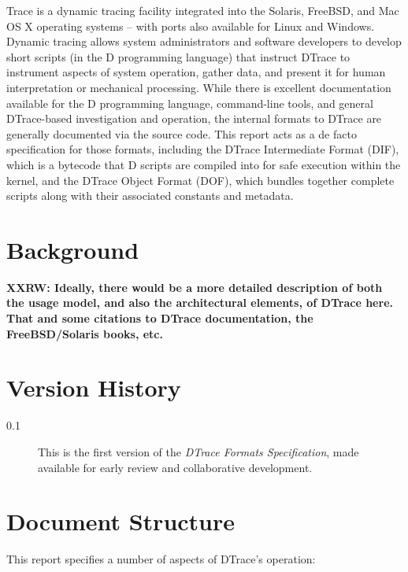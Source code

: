 Trace is a dynamic tracing facility integrated into the Solaris, FreeBSD,
and Mac OS X operating systems -- with ports also available for Linux and
Windows.
Dynamic tracing allows system administrators and software developers to
develop short scripts (in the D programming language) that instruct DTrace to
instrument aspects of system operation, gather data, and present it for human
interpretation or mechanical processing.
While there is excellent documentation available for the D programming
language, command-line tools, and general DTrace-based investigation and
operation, the internal formats to DTrace are generally documented via the
source code.
This report acts as a de facto specification for those formats, including
the DTrace Intermediate Format (DIF), which is a bytecode that D scripts are
compiled into for safe execution within the kernel, and the DTrace Object
Format (DOF), which bundles together complete scripts along with their
associated constants and metadata.

\section{Background}

\textbf{XXRW: Ideally, there would be a more detailed description of both the
usage model, and also the architectural elements, of DTrace here.
That and some citations to DTrace documentation, the FreeBSD/Solaris books,
etc.}

\section{Version History}

\begin{description}
\item[0.1] This is the first version of the \textit{DTrace Formats
  Specification}, made available for early review and collaborative
  development.
\end{description}

\section{Document Structure}

This report specifies a number of aspects of DTrace's operation:

